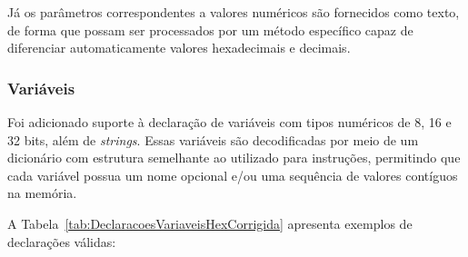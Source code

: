 \documentclass[
	12pt,				%
	openright,			%
	oneside,			%
	a4paper,			%
	english,			%
	french,				%
	spanish,			%
	brazil,				%
	]{abntex2}
\begin{document}
Já os parâmetros correspondentes a valores numéricos são fornecidos como texto, de forma que possam ser processados por um método específico capaz de diferenciar automaticamente valores hexadecimais e decimais.

\subsubsection{Variáveis}

Foi adicionado suporte à declaração de variáveis com tipos numéricos de 8, 16 e 32 bits, além de \textit{strings}. Essas variáveis são decodificadas por meio de um dicionário com estrutura semelhante ao utilizado para instruções, permitindo que cada variável possua um nome opcional e/ou uma sequência de valores contíguos na memória.

A Tabela~\ref{tab:DeclaracoesVariaveisHexCorrigida} apresenta exemplos de declarações válidas:
\end{document}
